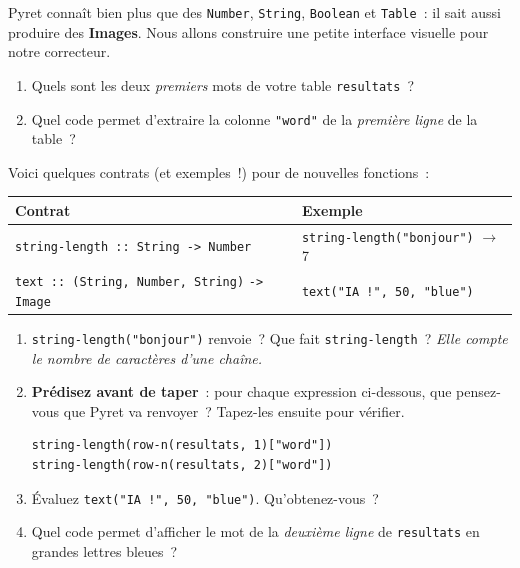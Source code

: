 \documentclass[12pt,a4paper]{article}
\begin{document}
Pyret connaît bien plus que des \texttt{Number}, \texttt{String}, \texttt{Boolean} et \texttt{Table}~: il sait aussi produire des \textbf{Images}. Nous allons construire une petite interface visuelle pour notre correcteur.

\begin{activitybox}
  \begin{enumerate}[leftmargin=*]
    \item Quels sont les deux \emph{premiers} mots de votre table \texttt{resultats}~?
    \item Quel code permet d'extraire la colonne \texttt{"word"} de la \emph{première ligne} de la table~?
  \end{enumerate}
\end{activitybox}

Voici quelques contrats (et exemples~!) pour de nouvelles fonctions~:

\begin{center}
\small
\begin{tabularx}{\textwidth}{l X}
  \toprule
  \textbf{Contrat} & \textbf{Exemple} \\
  \midrule
  \texttt{string-length :: String -> Number} & \texttt{string-length("bonjour")} $\to$ 7 \\
  \texttt{text :: (String, Number, String)} \texttt{-> Image} & \texttt{text("IA~!", 50, "blue")} \\
  \bottomrule
\end{tabularx}
\end{center}

\begin{activitybox}
  \begin{enumerate}[leftmargin=*, resume]
    \item \texttt{string-length("bonjour")} renvoie~? Que fait \texttt{string-length}~? \emph{Elle compte le nombre de caractères d'une chaîne.}
    \item \textbf{Prédisez avant de taper}~: pour chaque expression ci-dessous, que pensez-vous que Pyret va renvoyer~? Tapez-les ensuite pour vérifier.
    \begin{lstlisting}
string-length(row-n(resultats, 1)["word"])
string-length(row-n(resultats, 2)["word"])
    \end{lstlisting}
    \item Évaluez \texttt{text("IA~!", 50, "blue")}. Qu'obtenez-vous~?
    \item Quel code permet d'afficher le mot de la \emph{deuxième ligne} de \texttt{resultats} en grandes lettres bleues~?
  \end{enumerate}
\end{activitybox}
\end{document}
